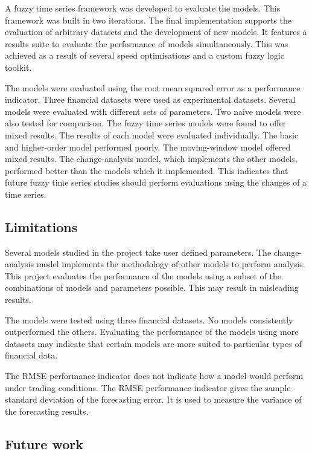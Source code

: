 \documentclass[12pt, oneside, a4paper]{article}
\theoremstyle{definition}
\begin{document}
A fuzzy time series framework was developed to evaluate the models. This framework was built in two iterations. The final implementation supports the evaluation of arbitrary datasets and the development of new models. It features a results suite to evaluate the performance of models simultaneously. This was achieved as a result of several speed optimisations and a custom fuzzy logic toolkit.

The models were evaluated using the root mean squared error as a performance indicator. Three financial datasets were used as experimental datasets. Several models were evaluated with different sets of parameters. Two naive models were also tested for comparison. The fuzzy time series models were found to offer mixed results. The results of each model were evaluated individually. The basic and higher-order model performed poorly. The moving-window model offered mixed results. The change-analysis model, which implements the other models, performed better than the models which it implemented. This indicates that future fuzzy time series studies should perform evaluations using the changes of a time series.

\subsection{Limitations}

Several models studied in the project take user defined parameters. The change-analysis model implements the methodology of other models to perform analysis. This project evaluates the performance of the models using a subset of the combinations of models and parameters possible. This may result in misleading results.

The models were tested using three financial datasets. No models consistently outperformed the others. Evaluating the performance of the models using more datasets may indicate that certain models are more suited to particular types of financial data.

The RMSE performance indicator does not indicate how a model would perform under trading conditions. The RMSE performance indicator gives the sample standard deviation of the forecasting error. It is used to measure the variance of the forecasting results. 

\subsection{Future work}
\end{document}
